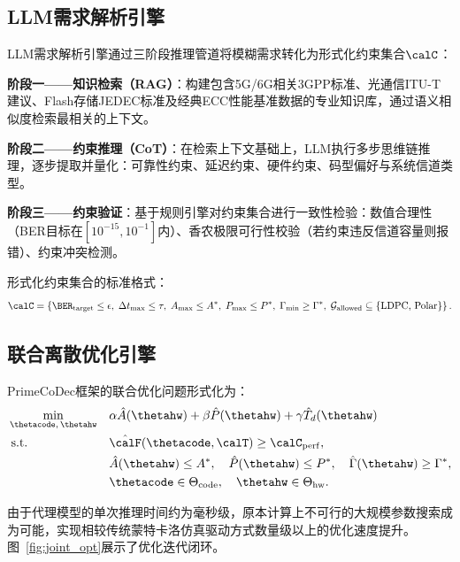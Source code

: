 \subsection{LLM需求解析引擎}\label{sec:llm_engine}

LLM需求解析引擎通过三阶段推理管道将模糊需求转化为形式化约束集合$\calC$：

\textbf{阶段一——知识检索（RAG）}：构建包含5G/6G相关3GPP标准、光通信ITU-T建议、Flash存储JEDEC标准及经典ECC性能基准数据的专业知识库，通过语义相似度检索最相关的上下文。

\textbf{阶段二——约束推理（CoT）}：在检索上下文基础上，LLM执行多步思维链推理，逐步提取并量化：可靠性约束、延迟约束、硬件约束、码型偏好与系统信道类型。

\textbf{阶段三——约束验证}：基于规则引擎对约束集合进行一致性检验：数值合理性（BER目标在$[10^{-15}, 10^{-1}]$内）、香农极限可行性校验（若约束违反信道容量则报错）、约束冲突检测。

形式化约束集合的标准格式：
\begin{equation}
  \calC = \left\{
  \BER_{\mathrm{target}} \leq \epsilon,\;
  \Delta t_{\max} \leq \tau,\;
  A_{\max} \leq A^*,\;
  P_{\max} \leq P^*,\;
  \Gamma_{\min} \geq \Gamma^*,\;
  \mathcal{G}_{\mathrm{allowed}} \subseteq \{\text{LDPC, Polar}\}
  \right\}.
\end{equation}

\subsection{联合离散优化引擎}\label{sec:optimizer}

PrimeCoDec框架的联合优化问题形式化为：
\begin{equation}
\begin{aligned}
  & \min_{\thetacode,\,\thetahw} && \alpha \hat{A}(\thetahw) + \beta \hat{P}(\thetahw) + \gamma \hat{T}_d(\thetahw)\\
  & \;\mathrm{s.t.}             && \hat{\calF}(\thetacode, \calT) \geq \calC_{\mathrm{perf}},\\
  &                             && \hat{A}(\thetahw) \leq A^*,\quad \hat{P}(\thetahw) \leq P^*,\quad \hat{\Gamma}(\thetahw) \geq \Gamma^*,\\
  &                             && \thetacode \in \Theta_{\mathrm{code}},\quad \thetahw \in \Theta_{\mathrm{hw}}.
\end{aligned}
\label{eq:joint_opt}
\end{equation}

由于代理模型的单次推理时间约为毫秒级，原本计算上不可行的大规模参数搜索成为可能，实现相较传统蒙特卡洛仿真驱动方式数量级以上的优化速度提升。图~\ref{fig:joint_opt}展示了优化迭代闭环。

